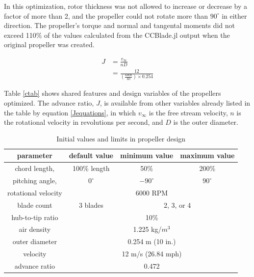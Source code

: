 \documentclass[journal ]{new-aiaa}
\newcounter{ctab}
\begin{document}
In this optimization, rotor thickness was not allowed to increase or decrease by a factor of more than 2, and the propeller could not rotate more than $90^{\circ}$ in either direction. The propeller's torque and normal and tangental moments did not exceed 110\% of the values calculated from the CCBlade.jl output when the original propeller was created.

\begin{equation}
	\begin{aligned}
	J & = \frac{v_{\infty}}{n D} \\
	& = \frac{12}{(\frac{6000}{60}) \times 0.254}
	\end{aligned}
	\label{Jequations}
\end{equation}

Table \eqref{ctab} shows shared features and design variables of the propellers optimized. The advance ratio, $J$, is available from other variables already listed in the table by equation \eqref{Jequations}, in which $v_{\infty}$ is the free stream velocity, $n$ is the rotational velocity in revolutions per second, and $D$ is the outer diameter.

\begin{table}[H]
 \centering
 \begin{tabular}{| c | c | c | c |} \hline
 	 \textbf{parameter} & \textbf{default value} & \textbf{minimum value} & \textbf{maximum value} \\ \hline
	 chord length, & 100\% length & 50\% & 200\% \\ \hline
	 pitching angle, & $0^{\circ}$ & $-90^{\circ}$ & $90^{\circ}$ \\ \hline \hline
	 rotational velocity & \multicolumn{3}{c|}{6000 RPM} \\ \hline
	 blade count & 3 blades & \multicolumn{2}{c|}{2, 3, or 4}\\ \hline
	 hub-to-tip ratio & \multicolumn{3}{c|}{10\%} \\ \hline
	 air density & \multicolumn{3}{c|}{1.225 kg/$m^{3}$} \\ \hline
	 outer diameter & \multicolumn{3}{c|}{0.254 m (10 in.)} \\ \hline
	 velocity & \multicolumn{3}{c|}{12 m/s (26.84 mph)} \\ \hline
	 advance ratio & \multicolumn{3}{c|}{0.472} \\ \hline
 \end{tabular}
 \caption{Initial values and limits in propeller design}
 \label{ctab}
\end{table}
\end{document}
